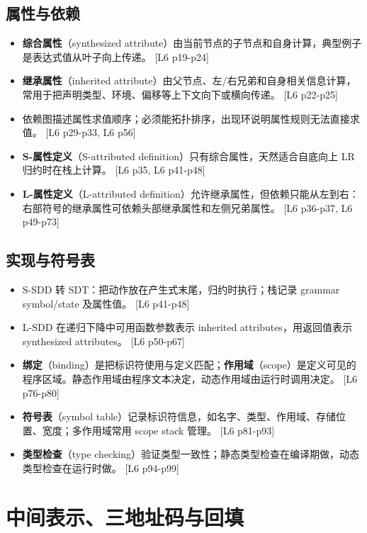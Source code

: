 \documentclass[UTF8,fontset=none,11pt]{ctexart}
\newcommand{\pg}[1]{{\scriptsize\textcolor{citegray}{[#1]}}}
\newcommand{\term}[2]{\textbf{#1}（#2）}
\begin{document}
\subsection{属性与依赖}

\begin{itemize}
  \item \term{综合属性}{synthesized attribute}由当前节点的子节点和自身计算，典型例子是表达式值从叶子向上传递。 \pg{L6 p19-p24}
  \item \term{继承属性}{inherited attribute}由父节点、左/右兄弟和自身相关信息计算，常用于把声明类型、环境、偏移等上下文向下或横向传递。 \pg{L6 p22-p25}
  \item 依赖图描述属性求值顺序；必须能拓扑排序，出现环说明属性规则无法直接求值。 \pg{L6 p29-p33, L6 p56}
  \item \term{S-属性定义}{S-attributed definition}只有综合属性，天然适合自底向上 LR 归约时在栈上计算。 \pg{L6 p35, L6 p41-p48}
  \item \term{L-属性定义}{L-attributed definition}允许继承属性，但依赖只能从左到右：右部符号的继承属性可依赖头部继承属性和左侧兄弟属性。 \pg{L6 p36-p37, L6 p49-p73}
\end{itemize}

\subsection{实现与符号表}

\begin{itemize}
  \item S-SDD 转 SDT：把动作放在产生式末尾，归约时执行；栈记录 grammar symbol/state 及属性值。 \pg{L6 p41-p48}
  \item L-SDD 在递归下降中可用函数参数表示 inherited attributes，用返回值表示 synthesized attributes。 \pg{L6 p50-p67}
  \item \term{绑定}{binding}是把标识符使用与定义匹配；\term{作用域}{scope}是定义可见的程序区域。静态作用域由程序文本决定，动态作用域由运行时调用决定。 \pg{L6 p76-p80}
  \item \term{符号表}{symbol table}记录标识符信息，如名字、类型、作用域、存储位置、宽度；多作用域常用 scope stack 管理。 \pg{L6 p81-p93}
  \item \term{类型检查}{type checking}验证类型一致性；静态类型检查在编译期做，动态类型检查在运行时做。 \pg{L6 p94-p99}
\end{itemize}

\section{中间表示、三地址码与回填}
\end{document}
